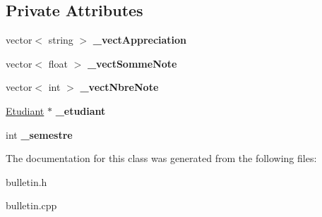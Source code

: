 \subsection*{Private Attributes}
\begin{DoxyCompactItemize}
\item 
\hypertarget{class_bulletin_a3f10c21147188d50657db1b880ee2be0}{vector$<$ string $>$ {\bfseries \-\_\-vect\-Appreciation}}\label{class_bulletin_a3f10c21147188d50657db1b880ee2be0}

\item 
\hypertarget{class_bulletin_a9d1e8e60813574a92295ca08690eaa16}{vector$<$ float $>$ {\bfseries \-\_\-vect\-Somme\-Note}}\label{class_bulletin_a9d1e8e60813574a92295ca08690eaa16}

\item 
\hypertarget{class_bulletin_aff34e5e921122f79ee78bf25330a46a8}{vector$<$ int $>$ {\bfseries \-\_\-vect\-Nbre\-Note}}\label{class_bulletin_aff34e5e921122f79ee78bf25330a46a8}

\item 
\hypertarget{class_bulletin_a0890a7a5b41420033e5d5bff7f5f8cee}{\hyperlink{class_etudiant}{Etudiant} $\ast$ {\bfseries \-\_\-etudiant}}\label{class_bulletin_a0890a7a5b41420033e5d5bff7f5f8cee}

\item 
\hypertarget{class_bulletin_a23e88c5cafcff39474ec021d39b54a39}{int {\bfseries \-\_\-semestre}}\label{class_bulletin_a23e88c5cafcff39474ec021d39b54a39}

\end{DoxyCompactItemize}


The documentation for this class was generated from the following files\-:\begin{DoxyCompactItemize}
\item 
bulletin.\-h\item 
bulletin.\-cpp\end{DoxyCompactItemize}
